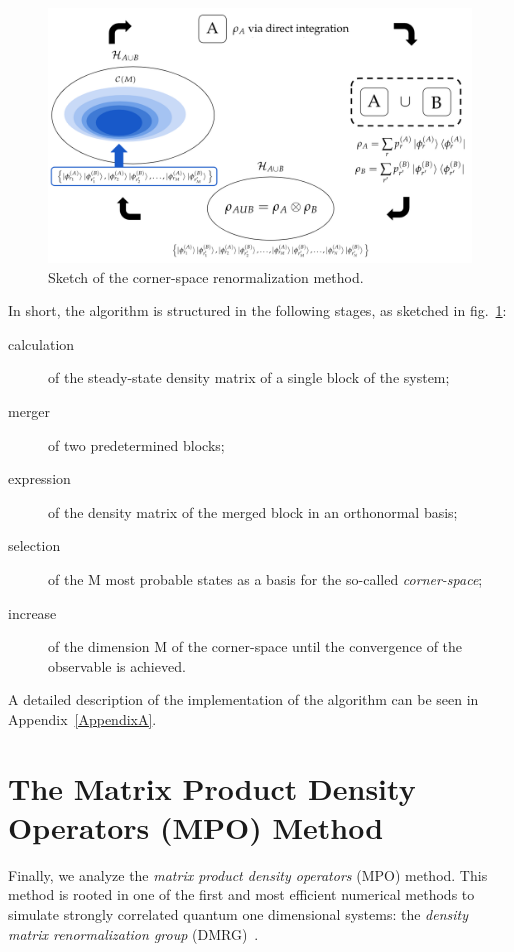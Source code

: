 \begin{figure}
    \centering
    \includegraphics[scale=0.55]{Figures/csr_sketch}
    \captionsetup{width=1.\linewidth}
    \caption{Sketch of the corner-space renormalization method.}
    \label{fig:csr_sketch}
\end{figure}

\bigskip
In short, the algorithm is structured in the following stages, as sketched in fig.~\ref{fig:csr_sketch}:
\begin{description}
    \item[calculation] of the steady-state density matrix of a single block of the system;
    \item[merger] of two predetermined blocks;
    \item[expression] of the density matrix of the merged block in an orthonormal basis;
    \item[selection] of the M most probable states as a basis for the so-called \emph{corner-space};
    \item[increase] of the dimension M of the corner-space until the convergence of the observable is achieved.
\end{description}

A detailed description of the implementation of the algorithm can be seen in Appendix~\ref{AppendixA}.


\section{The Matrix Product Density Operators (MPO) Method}
\label{chap_numMethods_MPO}
Finally, we analyze the \emph{matrix product density operators} (MPO) method.
This method is rooted in one of the first and most efficient numerical methods to simulate strongly correlated quantum one dimensional systems: the \emph{density matrix renormalization group} (DMRG)~\cite{s_white:dmrg, PhysRevB.48.10345, RevModPhys.77.259}.

